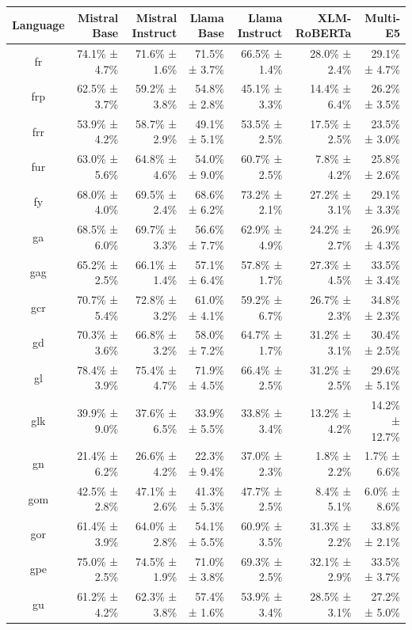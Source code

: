 \documentclass[10pt, a4paper]{article}
\begin{document}
\begin{table}[h]
\centering
\scriptsize
\begin{tabular}{crrrrrr}
\hline
\textbf{Language} & \textbf{Mistral Base} & \textbf{Mistral Instruct} & \textbf{Llama Base} & \textbf{Llama Instruct} & \textbf{XLM-RoBERTa} & \textbf{Multi-E5} \\
\hline
fr & 74.1\% ± 4.7\% & 71.6\% ± 1.6\% & 71.5\% ± 3.7\% & 66.5\% ± 1.4\% & 28.0\% ± 2.4\% & 29.1\% ± 4.7\% \\
frp & 62.5\% ± 3.7\% & 59.2\% ± 3.8\% & 54.8\% ± 2.8\% & 45.1\% ± 3.3\% & 14.4\% ± 6.4\% & 26.2\% ± 3.5\% \\
frr & 53.9\% ± 4.2\% & 58.7\% ± 2.9\% & 49.1\% ± 5.1\% & 53.5\% ± 2.5\% & 17.5\% ± 2.5\% & 23.5\% ± 3.0\% \\
fur & 63.0\% ± 5.6\% & 64.8\% ± 4.6\% & 54.0\% ± 9.0\% & 60.7\% ± 2.5\% & 7.8\% ± 4.2\% & 25.8\% ± 2.6\% \\
fy & 68.0\% ± 4.0\% & 69.5\% ± 2.4\% & 68.6\% ± 6.2\% & 73.2\% ± 2.1\% & 27.2\% ± 3.1\% & 29.1\% ± 3.3\% \\
ga & 68.5\% ± 6.0\% & 69.7\% ± 3.3\% & 56.6\% ± 7.7\% & 62.9\% ± 4.9\% & 24.2\% ± 2.7\% & 26.9\% ± 4.3\% \\
gag & 65.2\% ± 2.5\% & 66.1\% ± 1.4\% & 57.1\% ± 6.4\% & 57.8\% ± 1.7\% & 27.3\% ± 4.5\% & 33.5\% ± 3.4\% \\
gcr & 70.7\% ± 5.4\% & 72.8\% ± 3.2\% & 61.0\% ± 4.1\% & 59.2\% ± 6.7\% & 26.7\% ± 2.3\% & 34.8\% ± 2.3\% \\
gd & 70.3\% ± 3.6\% & 66.8\% ± 3.2\% & 58.0\% ± 7.2\% & 64.7\% ± 1.7\% & 31.2\% ± 3.1\% & 30.4\% ± 2.5\% \\
gl & 78.4\% ± 3.9\% & 75.4\% ± 4.7\% & 71.9\% ± 4.5\% & 66.4\% ± 2.5\% & 31.2\% ± 2.5\% & 29.6\% ± 5.1\% \\
glk & 39.9\% ± 9.0\% & 37.6\% ± 6.5\% & 33.9\% ± 5.5\% & 33.8\% ± 3.4\% & 13.2\% ± 4.2\% & 14.2\% ± 12.7\% \\
gn & 21.4\% ± 6.2\% & 26.6\% ± 4.2\% & 22.3\% ± 9.4\% & 37.0\% ± 2.3\% & 1.8\% ± 2.2\% & 1.7\% ± 6.6\% \\
gom & 42.5\% ± 2.8\% & 47.1\% ± 2.6\% & 41.3\% ± 5.3\% & 47.7\% ± 2.5\% & 8.4\% ± 5.1\% & 6.0\% ± 8.6\% \\
gor & 61.4\% ± 3.9\% & 64.0\% ± 2.8\% & 54.1\% ± 5.5\% & 60.9\% ± 3.5\% & 31.3\% ± 2.2\% & 33.8\% ± 2.1\% \\
gpe & 75.0\% ± 2.5\% & 74.5\% ± 1.9\% & 71.0\% ± 3.8\% & 69.3\% ± 2.5\% & 32.1\% ± 2.9\% & 33.5\% ± 3.7\% \\
gu & 61.2\% ± 4.2\% & 62.3\% ± 3.8\% & 57.4\% ± 1.6\% & 53.9\% ± 3.4\% & 28.5\% ± 3.1\% & 27.2\% ± 5.0\% \\

\end{tabular}
\end{table}
\end{document}
